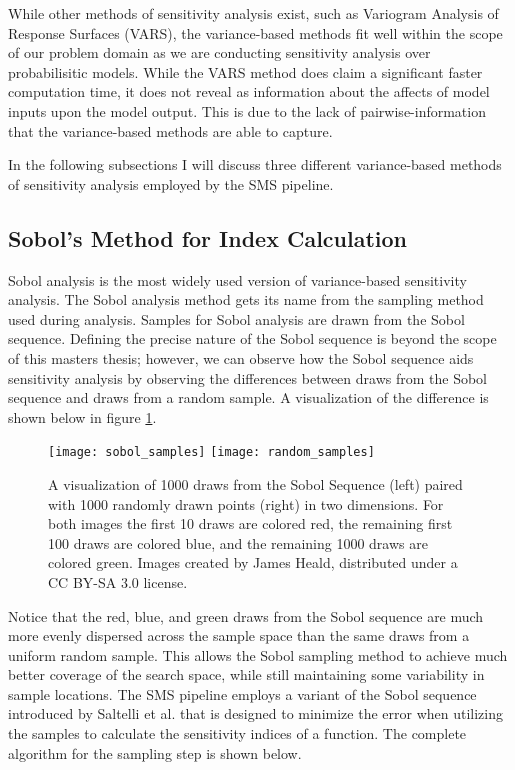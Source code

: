 While other methods of sensitivity analysis exist, such as Variogram Analysis of Response Surfaces (VARS), the variance-based methods fit well within the scope of our problem domain as we are conducting sensitivity analysis over probabilisitic models. While the VARS method does claim a significant faster computation time, it does not reveal as information about the affects of model inputs upon the model output. This is due to the lack of pairwise-information that the variance-based methods are able to capture.

In the following subsections I will discuss three different variance-based methods of sensitivity analysis employed by the SMS pipeline.

\subsection{Sobol's Method for Index Calculation\label{sec:sobol_analysis}}
Sobol analysis is the most widely used version of variance-based sensitivity analysis. The Sobol analysis method gets its name from the sampling method used during analysis. Samples for Sobol analysis are drawn from the Sobol sequence. Defining the precise nature of the Sobol sequence is beyond the scope of this masters thesis; however, we can observe how the Sobol sequence aids sensitivity analysis by observing the differences between draws from the Sobol sequence and draws from a random sample. A visualization of the difference is shown below in figure \ref{sobol_seq_vis}.

\FloatBarrier
\begin{figure}[!htbp]
    \label{sobol_seq_vis}
    \centering
    \texttt{[image: sobol\_samples]}\hfill
    \texttt{[image: random\_samples]}
    \caption[Sobol Sequence Visualization]{A visualization of 1000 draws from the Sobol Sequence (left) paired with 1000 randomly drawn points (right) in two dimensions. For both images the first 10 draws are colored red, the remaining first 100 draws are colored blue, and the remaining 1000 draws are colored green. Images created by James Heald, distributed under a CC BY-SA 3.0 license.}
\end{figure}
\FloatBarrier

Notice that the red, blue, and green draws from the Sobol sequence are much more evenly dispersed across the sample space than the same draws from a uniform random sample. This allows the Sobol sampling method to achieve much better coverage of the search space, while still maintaining some variability in sample locations. The SMS pipeline employs a variant of the Sobol sequence introduced by Saltelli et al. that is designed to minimize the error when utilizing the samples to calculate the sensitivity indices of a function. The complete algorithm for the sampling step is shown below.

